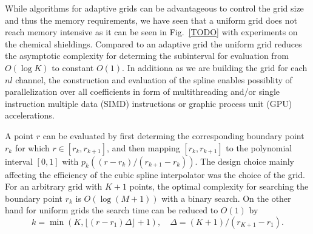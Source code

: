 While algorithms for adaptive grids can be advantageous to control the grid size and thus the memory requirements, we have seen that a uniform grid does not reach memory intensive as it can be seen in Fig.~\ref{TODO} with experiments on the chemical shieldings\cite{TOOD}.
Compared to an adaptive grid the uniform grid reduces the asymptotic complexity for determing the subinterval for evaluation from $O(\log K)$ to constant $O(1)$.
In additiona as we are building the grid for each $nl$ channel, the construction and evaluation of the spline enables possiblity of parallelization over all coefficients in form of multithreading and/or single instruction multiple data (SIMD) instructions or graphic process unit (GPU) accelerations.

A point $r$ can be evaluated by first determing the corresponding boundary point $r_k$ for which $r\in[r_k,r_{k+1}]$, and then mapping $[r_k,r_{k+1}]$ to the polynomial interval $[0,1]$ with $p_k((r-r_k)/(r_{k+1}-r_k))$.
The design choice mainly affecting the efficiency of the cubic spline interpolator was the choice of the grid.
For an arbitrary grid with $K+1$ points, the optimal complexity for searching the boundary point $r_k$ is $O(\log(M+1))$ with a binary search.
On the other hand for uniform grids the search time can be reduced to $O(1)$ by
\begin{equation}
    k = \min(K,\lfloor (r-r_1)\Delta \rfloor+1), \quad \Delta = (K+1)/(r_{K+1}-r_1).
\end{equation}
